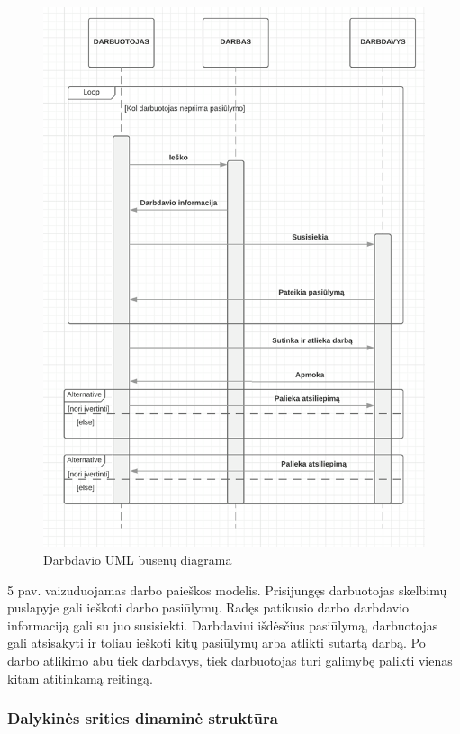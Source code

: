 \documentclass{VUMIFPSkursinis}
\begin{document}
\begin{figure}[H]
\centering
\includegraphics[scale=0.5]{img/va6.png}
\caption{Darbdavio UML būsenų diagrama}
\end{figure}
5 pav. vaizuduojamas darbo paieškos modelis. Prisijungęs darbuotojas skelbimų puslapyje gali ieškoti darbo pasiūlymų. Radęs patikusio darbo darbdavio informaciją gali su juo susisiekti. Darbdaviui išdėsčius pasiūlymą, darbuotojas gali atsisakyti ir toliau ieškoti kitų pasiūlymų arba atlikti sutartą darbą. Po darbo atlikimo abu tiek darbdavys, tiek darbuotojas turi galimybę palikti vienas kitam atitinkamą reitingą.

\subsubsection{Dalykinės srities dinaminė struktūra}
\end{document}

